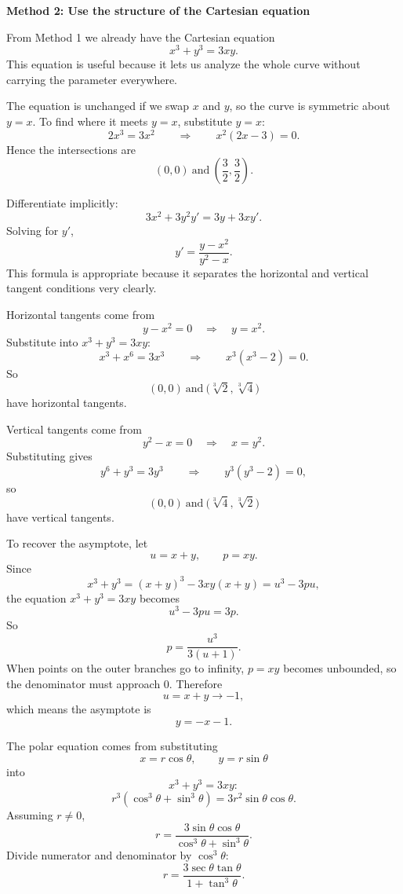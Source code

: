 \documentclass[a4paper,12pt,twocolumn]{article}
\newenvironment{solutionbox}{\begin{framed}}{\end{framed}}
\begin{document}
\begin{solutionbox}
\textbf{Method 2: Use the structure of the Cartesian equation}

\begin{steps}
\item From Method 1 we already have the Cartesian equation
\[
x^3+y^3=3xy.
\]
This equation is useful because it lets us analyze the whole curve without carrying the parameter everywhere.

\item The equation is unchanged if we swap \(x\) and \(y\), so the curve is symmetric about \(y=x\). To find where it meets \(y=x\), substitute \(y=x\):
\[
2x^3=3x^2
\qquad\Longrightarrow\qquad
x^2(2x-3)=0.
\]
Hence the intersections are
\[
\boxed{(0,0)\ \text{and}\ \left(\frac32,\frac32\right)}.
\]

\item Differentiate implicitly:
\[
3x^2+3y^2y'=3y+3xy'.
\]
Solving for \(y'\),
\[
y'=\frac{y-x^2}{y^2-x}.
\]
This formula is appropriate because it separates the horizontal and vertical tangent conditions very clearly.

Horizontal tangents come from
\[
y-x^2=0 \quad\Longrightarrow\quad y=x^2.
\]
Substitute into \(x^3+y^3=3xy\):
\[
x^3+x^6=3x^3
\qquad\Longrightarrow\qquad
x^3(x^3-2)=0.
\]
So
\[
\boxed{(0,0)\ \text{and}\ \bigl(\sqrt[3]{2},\sqrt[3]{4}\bigr)}
\]
have horizontal tangents.

Vertical tangents come from
\[
y^2-x=0 \quad\Longrightarrow\quad x=y^2.
\]
Substituting gives
\[
y^6+y^3=3y^3
\qquad\Longrightarrow\qquad
y^3(y^3-2)=0,
\]
so
\[
\boxed{(0,0)\ \text{and}\ \bigl(\sqrt[3]{4},\sqrt[3]{2}\bigr)}
\]
have vertical tangents.

\item To recover the asymptote, let
\[
u=x+y,\qquad p=xy.
\]
Since
\[
x^3+y^3=(x+y)^3-3xy(x+y)=u^3-3pu,
\]
the equation \(x^3+y^3=3xy\) becomes
\[
u^3-3pu=3p.
\]
So
\[
p=\frac{u^3}{3(u+1)}.
\]
When points on the outer branches go to infinity, \(p=xy\) becomes unbounded, so the denominator must approach \(0\). Therefore
\[
u=x+y\to-1,
\]
which means the asymptote is
\[
\boxed{y=-x-1.}
\]

\item The polar equation comes from substituting
\[
x=r\cos\theta,\qquad y=r\sin\theta
\]
into
\[
x^3+y^3=3xy:
\]
\[
r^3(\cos^3\theta+\sin^3\theta)=3r^2\sin\theta\cos\theta.
\]
Assuming \(r\ne0\),
\[
r=\frac{3\sin\theta\cos\theta}{\cos^3\theta+\sin^3\theta}.
\]
Divide numerator and denominator by \(\cos^3\theta\):
\[
\boxed{r=\frac{3\sec\theta\tan\theta}{1+\tan^3\theta}.}
\]


\end{steps}
\end{solutionbox}
\end{document}
